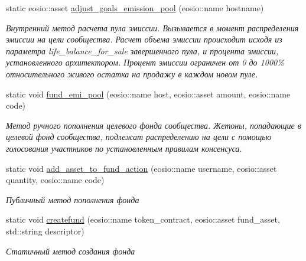 \begin{DoxyCompactItemize}
static eosio\+::asset \mbox{\hyperlink{classeosio_1_1unicore_acd0fd09c0cbd6459684222639c98d628}{adjust\+\_\+goals\+\_\+emission\+\_\+pool}} (eosio\+::name hostname)
\begin{DoxyCompactList}\small\item\em Внутренний метод расчета пула эмиссии. Вызывается в момент распределения эмиссии на цели сообщества. Расчет объема эмиссии происходит исходя из параметра life\+\_\+balance\+\_\+for\+\_\+sale завершенного пула, и процента эмиссии, установленного архитектором. Процент эмиссии ограничен от 0 до 1000\% относительного живого остатка на продажу в каждом новом пуле. \end{DoxyCompactList}\item 
static void \mbox{\hyperlink{classeosio_1_1unicore_a728e6dc69d5a0ce303b504b299bfdb4b}{fund\+\_\+emi\+\_\+pool}} (eosio\+::name host, eosio\+::asset amount, eosio\+::name code)
\begin{DoxyCompactList}\small\item\em Метод ручного пополнения целевого фонда сообщества. Жетоны, попадающие в целевой фонд сообщества, подлежат распределению на цели с помощью голосования участников по установленным правилам консенсуса. \end{DoxyCompactList}\item 
\mbox{\label{classeosio_1_1unicore_a136440444a225070ea36fe6497643c99}} 
static void \mbox{\hyperlink{classeosio_1_1unicore_a136440444a225070ea36fe6497643c99}{add\+\_\+asset\+\_\+to\+\_\+fund\+\_\+action}} (eosio\+::name username, eosio\+::asset quantity, eosio\+::name code)
\begin{DoxyCompactList}\small\item\em Публичный метод пополнения фонда \end{DoxyCompactList}\item 
\mbox{\label{classeosio_1_1unicore_a238e2f31fcf0852534c411eacecfeb3c}} 
static void \mbox{\hyperlink{classeosio_1_1unicore_a238e2f31fcf0852534c411eacecfeb3c}{createfund}} (eosio\+::name token\+\_\+contract, eosio\+::asset fund\+\_\+asset, std\+::string descriptor)
\begin{DoxyCompactList}\small\item\em Статичный метод создания фонда \end{DoxyCompactList}\item 
\mbox{\label{classeosio_1_1unicore_adfeb4fb3878a10d4acf6dc472566bc55}} 

\end{DoxyCompactItemize}
